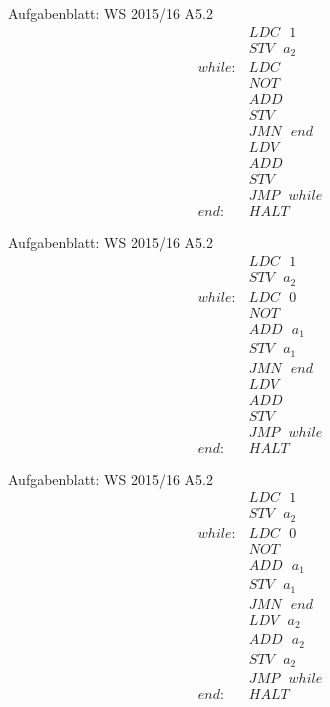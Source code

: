 \begin{frame}{Aufgabenblatt: WS 2015/16 A5.2}
  \begin{align*}
    &LDC\text{ }1 \\
    &STV\text{ }a_2\\
    while: &LDC\\
    &NOT\\
    &ADD\\
    &STV\\
    &JMN \text{ } end\\
    &LDV\\
    &ADD\\
    &STV\\
    &JMP\text{ }while\\
    end: &HALT
  \end{align*}
\end{frame}

\begin{frame}{Aufgabenblatt: WS 2015/16 A5.2}
  \begin{align*}
    &LDC\text{ }1 \\
    &STV\text{ }a_2\\
    while: &LDC\text{ }0\\
    &NOT\\
    &ADD\text{ }a_1\\
    &STV\text{ }a_1\\
    &JMN \text{ } end\\
    &LDV\\
    &ADD\\
    &STV\\
    &JMP\text{ }while\\
    end: &HALT
  \end{align*}
\end{frame}

\begin{frame}{Aufgabenblatt: WS 2015/16 A5.2}
  \begin{align*}
    &LDC\text{ }1 \\
    &STV\text{ }a_2\\
    while: &LDC\text{ }0\\
    &NOT\\
    &ADD\text{ }a_1\\
    &STV\text{ }a_1\\
    &JMN \text{ } end\\
    &LDV\text{ }a_2\\
    &ADD\text{ }a_2\\
    &STV\text{ }a_2\\
    &JMP\text{ }while\\
    end: &HALT
  \end{align*}
\end{frame}

